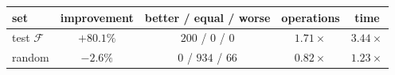 \begin{tabular}{@{}lcccc@{}}
\toprule
set & improvement & better / equal / worse & operations & time \\
\midrule
test $\mathcal{F}$ & $+80.1\%$ & $200$ / $0$ / $0$ & $1.71\times$ & $3.44\times$ \\
random & $-2.6\%$ & $0$ / $934$ / $66$ & $0.82\times$ & $1.23\times$ \\
\bottomrule
\end{tabular}
